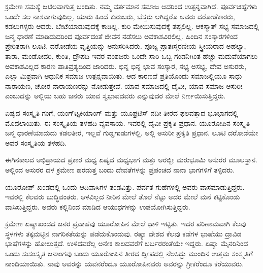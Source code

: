 \vskip 7pt

ಕ್ರಮೇಣ ಸಮಸ್ಯೆ ಜಟಿಲವಾಗುತ್ತ ಬಂದಿತು. ನಮ್ಮ ವರ್ತಮಾನ ಸಮಾಜ ಆದರಿಂದ ಉತ್ಪನ್ನವಾಗಿದೆ. ಪೂರ್ವಚಿಹ್ನೆಗಳು ಒಂದೇ ಸಲ ನಾಶವಾಗುವುದಿಲ್ಲ. ಯಾರು ಹಿಂದೆ ಕುರುಬರು, ಬೆಸ್ತರು ಆಗಿದ್ದರೊ ಅವರು ದರೋಡೆಕಾರರು, ಕಡಲುಗಳ್ಳರು ಆದರು. ಬೇಟೆಯಾಡುವುದಕ್ಕೆ ಕಾಡಿಲ್ಲ. ಕುರಿ ಮೇಯಿಸುವುದಕ್ಕೆ ತಪ್ಪಲಿಲ್ಲ. ಆಕಸ್ಮಾತ್​ ಸಭ್ಯ ಸಮಾಜದಲ್ಲಿ ಜನ್ಮ ಧಾರಣೆ ಮಾಡಿದುದರಿಂದ ಪೂರ್ವದಂತೆ ಜೀವನ ನಡೆಸಲು ಅವಕಾಶವಿರಲಿಲ್ಲ. ಹಿಂದಿನ ಸಂಸ್ಕಾರಗಳಿಂದ ಪ್ರೇರಿತರಾಗಿ ಲೂಟಿ, ದರೋಡೆಯ ವೃತ್ತಿಯನ್ನು ಅನುಸರಿಸಿದರು. ಪೂಜ್ಯ ಪ್ರಾತಃಸ್ಮರಣೀಯ ಸ್ತ್ರೀಯರಾದ ಅಹಲ್ಯಾ, ತಾರಾ, ಮಂಡೋದರಿ, ಕುಂತಿ, ದ್ರೌಪದಿ ಇವರ ವಂಶಜರು ಒಂದೇ ಸಾರಿ ಒಬ್ಬ ಗಂಡನಿಗಿಂತ ಹೆಚ್ಚು ಮದುವೆಯಾಗಲು ಅವಕಾಶವಿಲ್ಲದ ಕಾರಣ ಪಾತಿವ್ರತ್ಯದಿಂದ ಜಾರಿದರು. ಭಿನ್ನ ಭಿನ್ನ ಭಾವ ಸಂಸ್ಕಾರ, ಸಭ್ಯ ಅಸಭ್ಯ, ದೇವ ಅಸುರರು, ಎಲ್ಲಾ ಮಿಶ್ರವಾಗಿ ಆಧುನಿಕ ಸಮಾಜ ಉತ್ಪನ್ನವಾಯಿತು. ಆದ ಕಾರಣವೆ ಪ್ರತಿಯೊಂದು ಸಮಾಜಲ್ಲಿಯೂ ಸಾಧು ನಾರಾಯಣ, ಚೋರ ನಾರಾಯಣರನ್ನು ನೋಡುತ್ತೇವೆ. ಯಾವ ಸಮಾಜದಲ್ಲಿ ದೈವೀ, ಯಾವ ಸಮಾಜ ಆಸುರೀ ಎಂಬುದನ್ನು ಅಲ್ಲಿಯ ಬಹು ಜನರು ಯಾವ ಸ್ವಭಾವದವರು ಎನ್ನುವುದರ ಮೇಲೆ ನಿರ್ಣಯಿಸುತ್ತಿದ್ದರು.

\vskip 5pt

ಏಷ್ಯದ ಸಂಸ್ಕೃತಿ ಗಂಗೆ, ಯಂಗ್​ಟ್ಸಕಿಯಾಂಗ್​ ಮತ್ತು ಯೂಫ್ರಟಿಸ್​ ನದೀ ತೀರದ ಫಲವತ್ತಾದ ಭೂಭಾಗದಲ್ಲಿ ಮೊದಲಾಯಿತು. ಈ ಸಂಸ್ಕೃತಿಯ ತಳಹದಿ ವ್ಯವಸಾಯ. ಇವರಲ್ಲಿ ದೈವೀ ಪ್ರಕೃತಿ ಪ್ರಧಾನ. ಯೂರೋಪಿನ ಸಂಸ್ಕೃತಿ ಜನ್ಮ ಧಾರಣೆಯಾದುದು ಕಡಲತೀರ, ಇಲ್ಲವೆ ಗುಡ್ಡಗಾಡುಗಳಲ್ಲಿ. ಅಲ್ಲಿ ಅಸುರೀ ಪ್ರಕೃತಿ ಪ್ರಧಾನ. ಲೂಟಿ ದರೋಡೆಯೇ ಅವರ ಸಂಸ್ಕೃತಿಯ ತಳಹದಿ.

\vskip 5pt

ಈಗಿನಕಾಲದ ಅಭಿಪ್ರಾಯದ ಪ್ರಕಾರ ಮಧ್ಯ ಏಷ್ಯದ ಮಧ್ಯಭಾಗ ಮತ್ತು ಅರಬ್ಬೀ ಮರುಭೂಮಿ ಅಸುರರ ಮೂಲಸ್ಥಾನ. ಅಲ್ಲಿಂದ ಅಸುರರ ದಳ ಕ್ರಮೇಣ ಹರಡುತ್ತ ಬಂದು ದೇವತೆಗಳನ್ನು ಪ್ರಪಂಚದ ನಾನಾ ಭಾಗಗಳಿಗೆ ತಳ್ಳಿದರು.

\vskip 5pt

ಯೂರೋಪ್​ ಖಂಡದಲ್ಲಿ ಒಂದು ಆದಿವಾಸಿಗಳ ತಂಡವಿತ್ತು. ಪರ್ವತ ಗುಹೆಗಳಲ್ಲಿ ಅವರು ವಾಸಮಾಡುತ್ತಿದ್ದರು. ಇವರಲ್ಲಿ ಕೆಲವರು ಬುದ್ಧಿವಂತರು. ಆಳವಿಲ್ಲದ ನೀರಿನ ಮೇಲೆ ತೊಲೆ ನೆಟ್ಟು ಅದರ ಮೇಲೆ ಮನೆ ಕಟ್ಟಿಕೊಂಡು ವಾಸಿಸುತ್ತಿದ್ದರು. ಅವರು ಕಲ್ಲಿನಿಂದ ಮಾಡಿದ ಆಯುಧಗಳನ್ನು ಉಪಯೋಗಿಸುತ್ತಿದ್ದರು.

\vskip 5pt

ಕ್ರಮೇಣ ಏಷ್ಯಾಖಂಡದ ಜನರ ಪ್ರವಾಹವು ಯೂರೋಪಿನ ಮೇಲೆ ಧಾಳಿ ಇಟ್ಟಿತು. ಇದರ ಪರಿಣಾಮವಾಗಿ ಕೆಲವು ಸ್ಥಳಗಳು ತಕ್ಕಮಟ್ಟಿನ ನಾಗರಿಕತೆಯನ್ನು ಪಡೆದುಕೊಂಡುವು. ರಷ್ಯಾ ದೇಶದ ಕೆಲವು ಕಡೆಗಳ ಭಾಷೆಯು ದ್ರಾವಿಡ ಭಾಷೆಗಳನ್ನು ಹೋಲುತ್ತದೆ. ಉಳಿದವರೆಲ್ಲ ಅನೇಕ ಕಾಲದವರೆಗೆ ಬರ್ಬರರಂತೆಯೇ ಇದ್ದರು. ಏಷ್ಯಾ ಮೈನರಿನಿಂದ ಒಂದು ಸುಸಂಸ್ಕೃತ ಜನಾಂಗವು ಬಂದು ಯೂರೋಪಿನ ತೀರದ ದ್ವೀಪದಲ್ಲಿ ನೆಲಸಿದ್ದು ಮುಂದಿನ ಉತ್ತಮ ಸಂಸ್ಕೃತಿಗೆ ನಾಂದಿಯಾಯಿತು. ನಾವು ಅವರನ್ನು ಯವನರೆಂದೂ ಯೂರೋಪಿನವರು ಅವರನ್ನು ಗ್ರೀಕರೆಂದೂ ಕರೆಯುವರು.

\vskip 5pt

